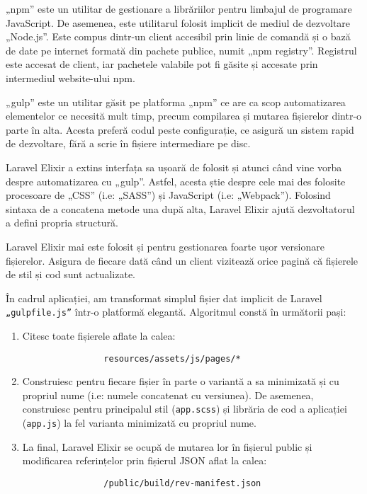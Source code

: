 		„npm” este un utilitar de gestionare a librăriilor pentru limbajul de programare JavaScript.
		De asemenea, este utilitarul folosit implicit de mediul de dezvoltare „Node.js”.
		Este compus dintr-un client accesibil prin linie de comandă și o bază de date pe internet formată din pachete publice, numit „npm registry”.
		Registrul este accesat de client, iar pachetele valabile pot fi găsite și accesate prin intermediul website-ului npm.\cite{npm}

		„gulp” este un utilitar găsit pe platforma „npm” ce are ca scop automatizarea elementelor ce necesită mult timp, precum compilarea și mutarea fișierelor dintr-o parte în alta.
		Acesta preferă codul peste configurație, ce asigură un sistem rapid de dezvoltare, fără a scrie în fișiere intermediare pe disc.

		Laravel Elixir a extins interfața sa ușoară de folosit și atunci când vine vorba despre automatizarea cu „gulp”.
		Astfel, acesta știe despre cele mai des folosite procesoare de „CSS” (i.e: „SASS”) și JavaScript (i.e: „Webpack”).
		Folosind sintaxa de a concatena metode una după alta, Laravel Elixir ajută dezvoltatorul a defini propria structură.

		Laravel Elixir mai este folosit și pentru gestionarea foarte ușor versionare fișierelor.
		Asigura de fiecare dată când un client vizitează orice pagină că fișierele de stil și cod sunt actualizate.

		În cadrul aplicației, am transformat simplul fișier dat implicit de Laravel \verb|„gulpfile.js”| într-o platformă elegantă.
		Algoritmul constă în următorii pași:
		\begin{enumerate}
			\item Citesc toate fișierele aflate la calea:
			\begin{verbatim}
				resources/assets/js/pages/*
			\end{verbatim}
			\item
			Construiesc pentru fiecare fișier în parte o variantă a sa minimizată și cu propriul nume (i.e: numele concatenat cu versiunea).
			De asemenea, construiesc pentru principalul stil (\verb|app.scss|) și librăria de cod a aplicației (\verb|app.js|) la fel varianta minimizată cu propriul nume.
			\item
			La final, Laravel Elixir se ocupă de mutarea lor în fișierul public și modificarea referințelor prin fișierul JSON aflat la calea:
			\begin{verbatim}
				/public/build/rev-manifest.json
			\end{verbatim}
		\end{enumerate}

